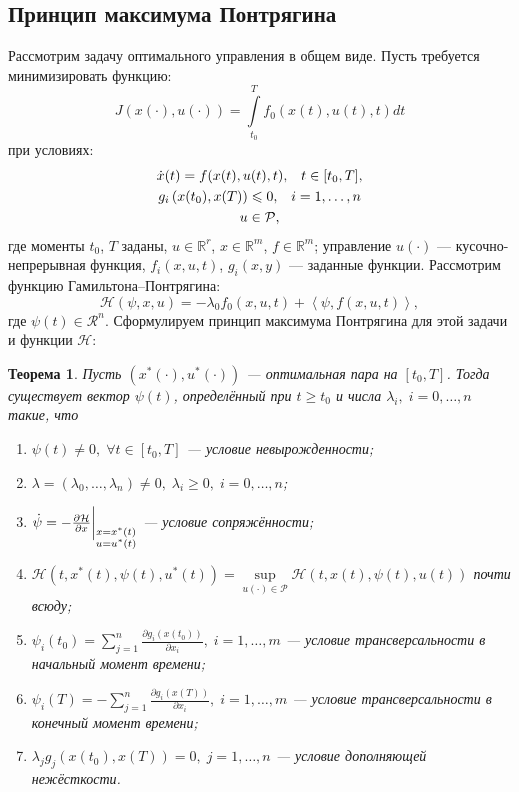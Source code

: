 \documentclass[11pt]{article}
\newtheorem{theorem}{Теорема}
\newcommand{\scalar}[2]{\left<#1,#2\right>}
\begin{document}
\subsection{Принцип максимума Понтрягина}
Рассмотрим задачу оптимального управления в общем виде. Пусть требуется минимизировать функцию:
$$
J(x(\cdot), u(\cdot)) = \int \limits_{t_0}^T f_0(x(t), u(t), t) dt
$$
при условиях:
\begin{gather}
\dot{x}(t) = f(x(t), u(t), t), \;\;\; t \in [t_0, T], \notag \\
g_i\left( x(t_0), x(T) \right) \leqslant 0, \;\;\; i = 1, \ldots, n \notag \\
u \in \mathcal{P}, \notag
\end{gather}
где моменты $t_0$, $T$ заданы, $u \in \mathbb{R}^r$, $x \in \mathbb{R}^m$, $f \in \mathbb{R}^m$; управление $u(\cdot)$ --- кусочно-непрерывная функция, $f_i(x, u, t)$, $g_i(x, y)$ --- заданные функции.
Рассмотрим функцию Гамильтона--Понтрягина:
$$
\mathcal{H}\left( \psi, x, u \right) = -\lambda_0 f_0(x, u, t) + \scalar{\psi}{f(x, u, t)},
$$
где $\psi(t) \in \mathcal{R}^n$. Сформулируем принцип максимума Понтрягина для этой задачи и функции $\mathcal{H}$:
\begin{theorem}
Пусть $\left( x^*(\cdot), u^*(\cdot) \right)$ --- оптимальная пара на $[t_0, T]$. Тогда существует вектор $\psi(t)$, определённый при $t \geqslant t_0$ и числа $\lambda_i, \; i = 0, \ldots, n$ такие, что
\begin{enumerate}
\item
$\psi(t) \neq 0, \; \forall t \in [t_0, T]$ --- условие невырожденности;
\item
$\lambda = \left( \lambda_0, \ldots, \lambda_n \right) \neq 0, \; \lambda_i \geqslant 0, \; i = 0, \ldots, n$;
\item
$\dot{\psi} = -\tfrac{\partial\mathcal{H}}{\partial x} \bigg{\rvert}_{\substack{x = x^*(t) \\ u = u^*(t)}}$ --- условие сопряжённости;
\item
$\mathcal{H}\left( t, x^*(t), \psi(t), u^*(t) \right) = \sup \limits_{u(\cdot) \in \mathcal{P}} \mathcal{H}\left( t, x(t), \psi(t), u(t) \right)$ почти всюду;
\item
$\psi_i(t_0) = \sum \limits_{j=1}^n \tfrac{\partial g_i\left( x(t_0) \right)}{\partial x_i}, \; i = 1, \ldots, m$ --- условие трансверсальности в начальный момент времени;
\item
$\psi_i(T) = -\sum \limits_{j=1}^n \tfrac{\partial g_i\left( x(T) \right)}{\partial x_i}, \; i = 1, \ldots, m$ --- условие трансверсальности в конечный момент времени;
\item
$\lambda_j g_j \left( x(t_0), x(T) \right) = 0, \; j = 1, \ldots, n$ --- условие дополняющей нежёсткости.
\end{enumerate}
\end{theorem}
\end{document}
